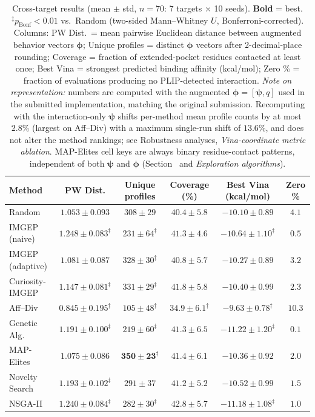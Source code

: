 \documentclass[journal=jcisd8,manuscript=article]{achemso}
\begin{document}
\begin{table}[ht]
\centering
\caption{Cross-target results (mean $\pm$ std, $n = 70$: 7 targets $\times$ 10 seeds). \textbf{Bold} = best. $^\ddagger p_\text{Bonf} < 0.01$ vs.\ Random (two-sided Mann--Whitney $U$, Bonferroni-corrected). Columns: PW Dist.\ = mean pairwise Euclidean distance between augmented behavior vectors $\boldsymbol{\phi}$; Unique profiles = distinct $\boldsymbol{\phi}$ vectors after 2-decimal-place rounding; Coverage = fraction of extended-pocket residues contacted at least once; Best Vina = strongest predicted binding affinity (kcal/mol); Zero \% = fraction of evaluations producing no PLIP-detected interaction. \emph{Note on representation:} numbers are computed with the augmented $\boldsymbol{\phi}=[\boldsymbol{\psi},q]$ used in the submitted implementation, matching the original submission. Recomputing with the interaction-only $\boldsymbol{\psi}$ shifts per-method mean profile counts by at most $2.8\%$ (largest on Aff--Div) with a maximum single-run shift of $13.6\%$, and does not alter the method rankings; see Robustness analyses, \emph{Vina-coordinate metric ablation}. MAP-Elites cell keys are always binary residue-contact patterns, independent of both $\boldsymbol{\psi}$ and $\boldsymbol{\phi}$ (Section~ and \emph{Exploration algorithms}).}
\label{tab:cross}
\footnotesize
\setlength{\tabcolsep}{2.5pt}
\begin{tabular}{lccccc}
\toprule
\textbf{Method} & \textbf{PW Dist.} & \textbf{Unique profiles} & \textbf{Coverage (\%)} & \textbf{Best Vina (kcal/mol)} & \textbf{Zero \%} \\
\midrule
Random & $1.053 \pm 0.093$ & $308 \pm 29$ & $40.4 \pm 5.8$ & $-10.10 \pm 0.89$ & $4.1$ \\
IMGEP (naive) & $\mathbf{1.248 \pm 0.083}^\ddagger$ & $231 \pm 64^\ddagger$ & $41.3 \pm 4.6$ & $-10.64 \pm 1.10^\ddagger$ & $0.5$ \\
IMGEP (adaptive) & $1.081 \pm 0.087$ & $328 \pm 30^\ddagger$ & $40.8 \pm 5.7$ & $-10.27 \pm 0.89$ & $3.2$ \\
Curiosity-IMGEP & $1.147 \pm 0.081^\ddagger$ & $331 \pm 29^\ddagger$ & $41.8 \pm 5.8$ & $-10.40 \pm 0.99$ & $2.3$ \\
Aff--Div & $0.845 \pm 0.195^\ddagger$ & $105 \pm 48^\ddagger$ & $34.9 \pm 6.1^\ddagger$ & $-9.63 \pm 0.78^\ddagger$ & $10.3$ \\
Genetic Alg. & $1.191 \pm 0.100^\ddagger$ & $219 \pm 60^\ddagger$ & $41.3 \pm 6.5$ & $\mathbf{-11.22 \pm 1.20}^\ddagger$ & $\mathbf{0.1}$ \\
MAP-Elites & $1.075 \pm 0.086$ & $\mathbf{350 \pm 23}^\ddagger$ & $41.4 \pm 6.1$ & $-10.36 \pm 0.92$ & $2.0$ \\
Novelty Search & $1.193 \pm 0.102^\ddagger$ & $291 \pm 37$ & $41.2 \pm 5.2$ & $-10.52 \pm 0.99$ & $1.5$ \\
NSGA-II & $1.240 \pm 0.084^\ddagger$ & $282 \pm 30^\ddagger$ & $\mathbf{42.8 \pm 5.7}$ & $-11.18 \pm 1.08^\ddagger$ & $1.0$ \\
\bottomrule
\end{tabular}
\end{table}
\end{document}
